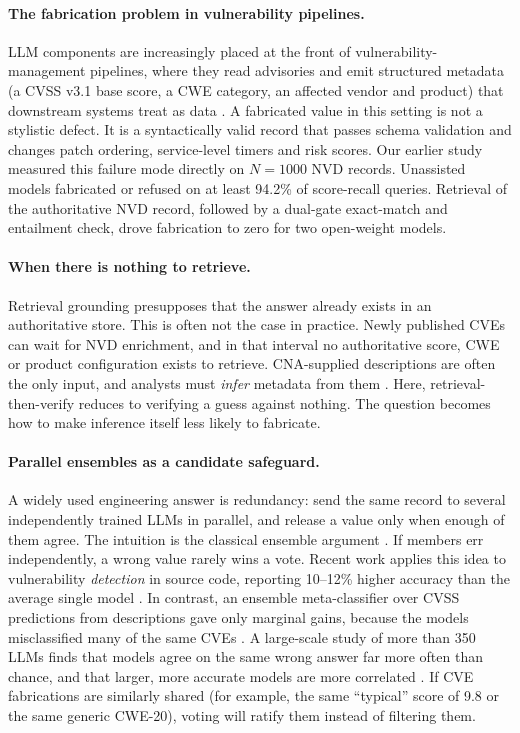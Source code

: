 \documentclass[11pt]{article}
\begin{document}
\paragraph{The fabrication problem in vulnerability pipelines.}
LLM components are increasingly placed at the front of vulnerability-management pipelines, where they read advisories and emit structured metadata (a CVSS v3.1 base score, a CWE category, an affected vendor and product) that downstream systems treat as data \citep{fayyazi2025proverag,alam2024ctibench}. A fabricated value in this setting is not a stylistic defect. It is a syntactically valid record that passes schema validation and changes patch ordering, service-level timers and risk scores. Our earlier study \citep{anon2026grounding} measured this failure mode directly on $N{=}1000$ NVD records. Unassisted models fabricated or refused on at least 94.2\% of score-recall queries. Retrieval of the authoritative NVD record, followed by a dual-gate exact-match and entailment check, drove fabrication to zero for two open-weight models.

\paragraph{When there is nothing to retrieve.}
Retrieval grounding presupposes that the answer already exists in an authoritative store. This is often not the case in practice. Newly published CVEs can wait for NVD enrichment, and in that interval no authoritative score, CWE or product configuration exists to retrieve. CNA-supplied descriptions are often the only input, and analysts must \emph{infer} metadata from them \citep{shahid2021cvssbert,jafarikhah2025description}. Here, retrieval-then-verify reduces to verifying a guess against nothing. The question becomes how to make inference itself less likely to fabricate.

\paragraph{Parallel ensembles as a candidate safeguard.}
A widely used engineering answer is redundancy: send the same record to several independently trained LLMs in parallel, and release a value only when enough of them agree. The intuition is the classical ensemble argument \citep{dietterich2000}. If members err independently, a wrong value rarely wins a vote. Recent work applies this idea to vulnerability \emph{detection} in source code, reporting 10--12\% higher accuracy than the average single model \citep{zibaeirad2025diverse}. In contrast, an ensemble meta-classifier over CVSS predictions from descriptions gave only marginal gains, because the models misclassified many of the same CVEs \citep{jafarikhah2025description}. A large-scale study of more than 350 LLMs finds that models agree on the same wrong answer far more often than chance, and that larger, more accurate models are more correlated \citep{kim2025correlated}. If CVE fabrications are similarly shared (for example, the same ``typical'' score of 9.8 or the same generic CWE-20), voting will ratify them instead of filtering them.
\end{document}
